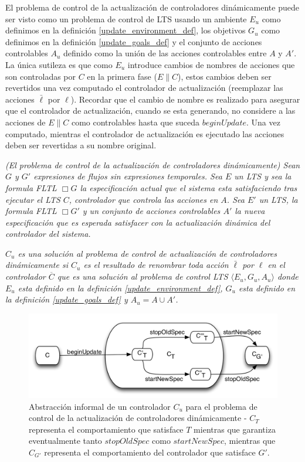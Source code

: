 El problema de control de la actualización de controladores dinámicamente puede ser visto como un problema de control de
LTS usando un ambiente $E_u$ como definimos en la definición \ref{update_environment_def}, los objetivos $G_u$ como
definimos en la definición \ref{update_goals_def} y el conjunto de acciones controlables $A_u$ definido como la unión de las
acciones controlables entre $A$ y $A'$. La única sutileza es que como $E_u$ introduce cambios de nombres de acciones que
son controladas por $C$ en la primera fase ($E\|C$), estos cambios deben ser revertidos una vez computado el controlador
de actualización (reemplazar las acciones $\bar{\ell}$ por $\ell$). Recordar que el cambio de nombre es realizado para
asegurar que el controlador de actualización, cuando se esta generando, no considere a las acciones de $E\|C$ como
controlables hasta que suceda $beginUpdate$. Una vez computado, mientras el controlador de actualización es ejecutado
las acciones deben ser revertidas a su nombre original.

\begin{nahaDef}
\emph{(El problema de control de la actualización de controladores dinámicamente) Sean $G$ y $G'$ expresiones de flujos
sin expresiones temporales. Sea $E$ un LTS y sea la formula FLTL $\Box G$ la especificación actual que el sistema esta
satisfaciendo tras ejecutar el LTS $C$, controlador que controla las acciones en $A$. Sea $E'$ un LTS, la formula FLTL
$\Box G'$ y un conjunto de acciones controlables $A'$ la nueva especificación que es esperada satisfacer con la
actualización dinámica del controlador del sistema.}

\emph{$C_u$ es una solución al problema de control de actualización de controladores dinámicamente si $C_u$ es el resultado de
renombrar toda acción $\bar{\ell}$ por $\ell$ en el controlador $\overline{C}$ que es una solución al problema de
control LTS $\langle E_u, G_u, A_u \rangle$ donde $E_u$ esta definido en la definición \ref{update_environment_def},
$G_u$ esta definido en la definición \ref{update_goals_def} y $A_u = A \cup A'$.}
\label{updating_controller_problem}
\end{nahaDef}

\begin{figure}
\centering
\includegraphics[scale=0.35]{img/C_u.png}
\caption{Abstracción informal de un controlador $C_u$ para el problema de control de la actualización de controladores
dinámicamente - $C_T$ representa el comportamiento que satisface $T$ mientras que garantiza eventualmente tanto
$stopOldSpec$ como $startNewSpec$, mientras que $C_{G'}$ representa el comportamiento del controlador que satisface
$G'$.}
\label{update_controller}
\end{figure}

